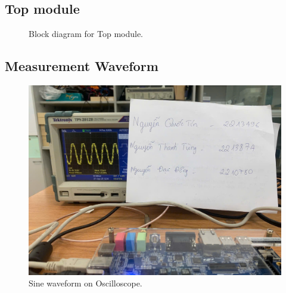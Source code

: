 \subsection{Top module}

\begin{figure}[H]
	\centering
	\caption{Block diagram for Top module.}
\end{figure}

\subsection{Measurement Waveform}

\begin{figure}[H]
	\centering
	\includegraphics[width=.9\linewidth]{./my-chapters/my-images/Gen_wave/hinh2.jpg}
	\caption{Sine waveform on Oscilloscope.}
\end{figure}

